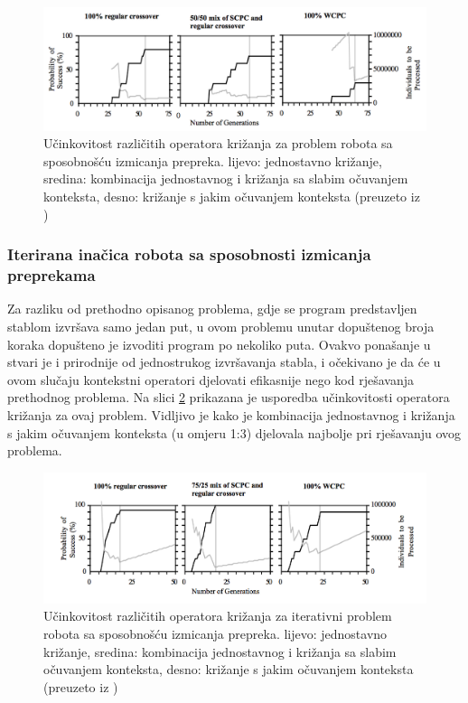\begin{figure}[H]
	\centering
	\includegraphics[scale=0.4]{./slike/robot.png}
	\caption{Učinkovitost različitih operatora križanja za problem robota sa sposobnošću izmicanja prepreka. lijevo: jednostavno križanje, sredina: kombinacija jednostavnog i križanja sa slabim očuvanjem konteksta, desno:  križanje s jakim očuvanjem konteksta (preuzeto iz \cite{crxContext})}
	\label{robot}
\end{figure}


\subsubsection{Iterirana inačica robota sa sposobnosti izmicanja preprekama}
Za razliku od prethodno opisanog problema, gdje se program predstavljen stablom izvršava samo jedan put, u ovom problemu unutar dopuštenog broja koraka dopušteno je izvoditi program po nekoliko puta. Ovakvo ponašanje u stvari je i prirodnije od jednostrukog izvršavanja stabla, i očekivano je da će u ovom slučaju kontekstni operatori djelovati efikasnije nego kod rješavanja prethodnog problema. Na slici \ref{robotIt} prikazana je usporedba učinkovitosti operatora križanja za ovaj problem. Vidljivo je kako je kombinacija jednostavnog i križanja s jakim očuvanjem konteksta (u omjeru 1:3) djelovala najbolje pri rješavanju ovog problema.

\begin{figure}[H]
	\centering
	\includegraphics[scale=0.4]{./slike/robotIt.png}
	\caption{Učinkovitost različitih operatora križanja za iterativni problem robota sa sposobnošću izmicanja prepreka. lijevo: jednostavno križanje, sredina: kombinacija jednostavnog i križanja sa slabim očuvanjem konteksta, desno:  križanje s jakim očuvanjem konteksta (preuzeto iz \cite{crxContext})}
	\label{robotIt}
\end{figure}



